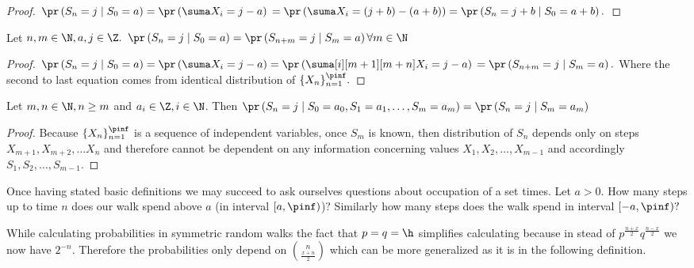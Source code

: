 \begin{proof}
 $\pr \left( S_n=j \mid S_0=a \right) =\pr \left( \suma X_i=j-a \right)\\
 =\pr \left( \suma X_i= \left( j+b \right) - \left( a+b \right) \right)
 =\pr \left( S_n=j+b \mid S_0=a+b \right).$
\end{proof}


\begin{lemma}\label{lemma-temporal_homogeneity}
  Let $n,m \in \N, a,j \in \Z.$
 $\pr \left( S_n=j \mid S_0=a \right) =\pr \left( S_{n+m}=j \mid S_m=a \right) \forall m \in \N$
\end{lemma}
\begin{proof}
 $\pr \left( S_n=j \mid S_0=a \right) =\pr \left( \suma X_i=j-a \right)
 =\pr \left( \suma[i][m+1][m+n]X_i=j-a \right)\\
 =\pr \left( S_{n+m}=j \mid S_m=a \right).$
 Where the second to last equation comes from identical distribution of $\{X_n\}_{n=1}^{\pinf}.$
\end{proof}

\begin{lemma}\label{lemma-markov_property}
 Let $m,n \in \N, n\geq m$ and $a_i \in \Z, i\in \N$. Then $\pr \left( S_n=j \mid S_0=a_0, S_1=a_1, \ldots, S_m=a_m \right)
 =\pr \left( S_n=j \mid S_m=a_m \right) $
\end{lemma}
\begin{proof}
 Because $\{X_n\}_{n=1}^\pinf$ is a sequence of independent variables, once $S_m$ is known, then distribution of $S_n$ depends only on steps ~\\$X_{m+1}, X_{m+2}, \ldots X_n$ and therefore cannot be dependent on any information concerning values $X_1, X_2, \ldots, X_{m-1}$ and accordingly $S_1, S_2, \ldots, S_{m-1}.$
\end{proof}

\begin{rem}
  Once having stated basic definitions we may succeed to ask ourselves questions about occupation of a set times. Let $a>0$. How many steps up to time $n$ does our walk spend above $a$ (in interval $[a,\pinf)$)? Similarly how many steps does the walk spend in interval $[-a,\pinf)?$
\end{rem}

\begin{rem}
 While calculating probabilities in symmetric random walks the fact that $p=q=\h$ simplifies calculating because in stead of $p^{\frac{n+x}{2}}q^{\frac{n-x}{2}}$ we now have $2^{-n}.$ Therefore the probabilities only depend on $\binom{n}{\frac{x+n}{2}}$ which can be more generalized as it is in the following definition.
\end{rem}


